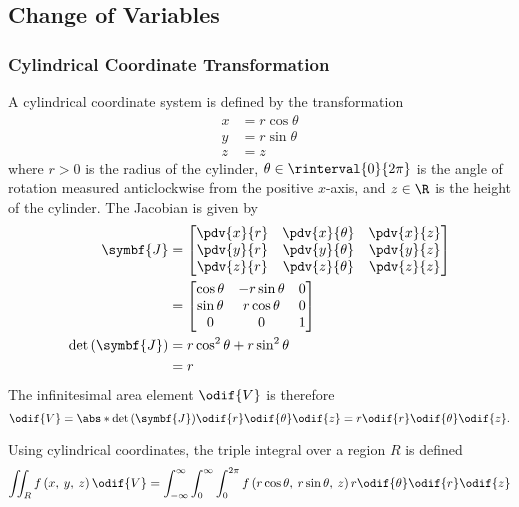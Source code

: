 \documentclass{article}
\begin{document}
\subsection{Change of Variables}
\subsubsection{Cylindrical Coordinate Transformation}
\begin{definition}
    A cylindrical coordinate system is defined by the \linebreak transformation
    \begin{align*}
        x & = r \cos{\theta} \\
        y & = r \sin{\theta} \\
        z & = z
    \end{align*}
    where \(r > 0\) is the radius of the cylinder,
    \(\theta \in \rinterval{0}{2\pi}\) is the angle of rotation
    measured anticlockwise from the positive \(x\)-axis, and \(z \in \R\)
    is the height of the cylinder.
    The Jacobian is given by
    \begin{align*}
        \symbf{J}                      & =
        \begin{bmatrix}
            \displaystyle\pdv{x}{r} & \displaystyle\pdv{x}{\theta} & \displaystyle\pdv{x}{z} \\
            \displaystyle\pdv{y}{r} & \displaystyle\pdv{y}{\theta} & \displaystyle\pdv{y}{z} \\
            \displaystyle\pdv{z}{r} & \displaystyle\pdv{z}{\theta} & \displaystyle\pdv{z}{z} \\
        \end{bmatrix}
        \\
                                       & =
        \begin{bmatrix}
            \cos{\theta} & -r \sin{\theta} & 0 \\
            \sin{\theta} & r \cos{\theta}  & 0 \\
            0            & 0               & 1 \\
        \end{bmatrix}
        \\
        \det{\left( \symbf{J} \right)} & = r \cos^2{\theta} + r \sin^2{\theta} \\
                                       & = r
    \end{align*}
    The infinitesimal area element \(\odif{V}\) is therefore
    \begin{equation*}
        \odif{V} = \abs*{\det{\left( \symbf{J} \right)}} \odif{r}\odif{\theta}\odif{z} = r \odif{r}\odif{\theta}\odif{z}.
    \end{equation*}
\end{definition}
Using cylindrical coordinates, the triple integral over a region \(R\) is
defined
\begin{equation*}
    \iint_R f\left( x,\: y,\: z \right) \odif{V} = \int_{-\infty}^{\infty} \int_0^\infty \int_0^{2\pi} f\left( r \cos{\theta},\: r \sin{\theta},\: z \right) r \odif{\theta} \odif{r} \odif{z}
\end{equation*}
\end{document}
